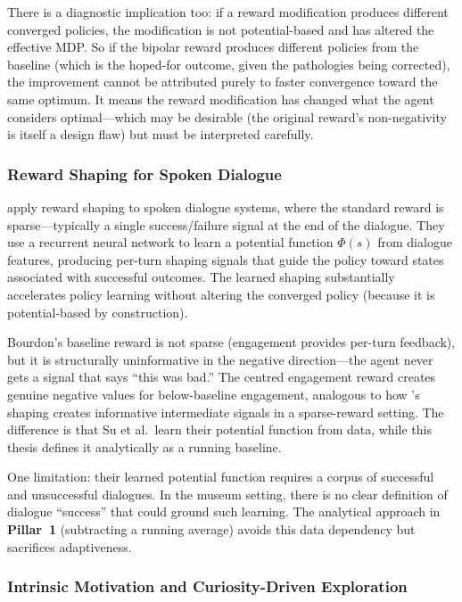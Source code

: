 \documentclass[a4paper, 11pt]{article}
\newcommand{\pillar}[1]{\textbf{Pillar~#1}}
\begin{document}
There is a diagnostic implication too: if a reward modification produces different converged policies, the modification is not potential-based and has altered the effective MDP. So if the bipolar reward produces different policies from the baseline (which is the hoped-for outcome, given the pathologies being corrected), the improvement cannot be attributed purely to faster convergence toward the same optimum. It means the reward modification has changed what the agent considers optimal---which may be desirable (the original reward's non-negativity is itself a design flaw) but must be interpreted carefully.

\subsubsection{Reward Shaping for Spoken Dialogue}

\citet{su2015reward} apply reward shaping to spoken dialogue systems, where the standard reward is sparse---typically a single success/failure signal at the end of the dialogue. They use a recurrent neural network to learn a potential function $\Phi(s)$ from dialogue features, producing per-turn shaping signals that guide the policy toward states associated with successful outcomes. The learned shaping substantially accelerates policy learning without altering the converged policy (because it is potential-based by construction).

Bourdon's baseline reward is not sparse (engagement provides per-turn feedback), but it is structurally uninformative in the negative direction---the agent never gets a signal that says ``this was bad.'' The centred engagement reward creates genuine negative values for below-baseline engagement, analogous to how \citet{su2015reward}'s shaping creates informative intermediate signals in a sparse-reward setting. The difference is that Su et al.\ learn their potential function from data, while this thesis defines it analytically as a running baseline.

One limitation: their learned potential function requires a corpus of successful and unsuccessful dialogues. In the museum setting, there is no clear definition of dialogue ``success'' that could ground such learning. The analytical approach in \pillar{1} (subtracting a running average) avoids this data dependency but sacrifices adaptiveness.

\subsubsection{Intrinsic Motivation and Curiosity-Driven Exploration}
\end{document}
